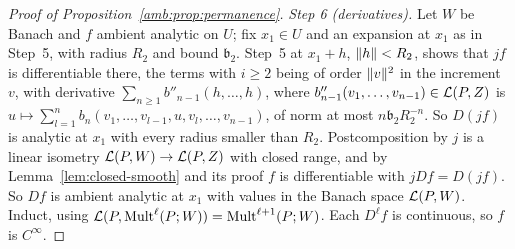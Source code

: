\begin{proof}[Proof of Proposition~\ref{amb:prop:permanence}]
\emph{Step 6 (derivatives).} Let $W$ be Banach and $f$ ambient analytic on $U$; fix $x_1\in U$ and an expansion at $x_1$ as in Step~5, with radius $R_2$ and bound $\mathfrak b_2$. Step~5 at $x_1+h$, $\lVert h\rVert<R_2$, shows that $jf$ is differentiable there, the terms with $i\ge2$ being of order $\lVert v\rVert^2$ in the increment $v$, with derivative $\sum_{n\ge1}b''_{n-1}(h,\dots,h)$, where $b''_{n-1}(v_1,\dots,v_{n-1})\in\mathcal L(P,Z)$ is $u\mapsto\sum_{l=1}^nb_n(v_1,\dots,v_{l-1},u,v_l,\dots,v_{n-1})$, of norm at most $n\mathfrak b_2R_2^{-n}$. So $D(jf)$ is analytic at $x_1$ with every radius smaller than $R_2$. Postcomposition by $j$ is a linear isometry $\mathcal L(P,W)\to\mathcal L(P,Z)$ with closed range, and by Lemma~\ref{lem:closed-smooth} and its proof $f$ is differentiable with $jDf=D(jf)$. So $Df$ is ambient analytic at $x_1$ with values in the Banach space $\mathcal L(P,W)$. Induct, using $\mathcal L(P,\operatorname{Mult}^\ell(P;W))=\operatorname{Mult}^{\ell+1}(P;W)$. Each $D^\ell f$ is continuous, so $f$ is $C^\infty$.
\end{proof}
